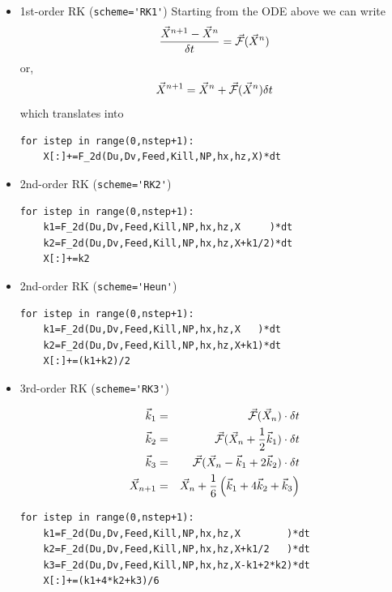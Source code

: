\begin{itemize}

\item 1st-order RK (\lstinline{scheme='RK1'})
Starting from the ODE above we can write
\[
\frac{\vec{X}^{n+1} -\vec{X}^{n} }{\delta t} = \vec{\cal F} (\vec{X}^n)
\]
or, 
\[
\vec{X}^{n+1}
=
\vec{X}^{n} + \vec{\cal F} (\vec{X}^n) \delta t
\]
which translates into
\begin{lstlisting}
for istep in range(0,nstep+1):
    X[:]+=F_2d(Du,Dv,Feed,Kill,NP,hx,hz,X)*dt
\end{lstlisting}

\item 2nd-order RK (\lstinline{scheme='RK2'})
\begin{lstlisting}
for istep in range(0,nstep+1):
    k1=F_2d(Du,Dv,Feed,Kill,NP,hx,hz,X     )*dt
    k2=F_2d(Du,Dv,Feed,Kill,NP,hx,hz,X+k1/2)*dt
    X[:]+=k2
\end{lstlisting}

\item 2nd-order RK (\lstinline{scheme='Heun'})

\begin{lstlisting}
for istep in range(0,nstep+1):
    k1=F_2d(Du,Dv,Feed,Kill,NP,hx,hz,X   )*dt
    k2=F_2d(Du,Dv,Feed,Kill,NP,hx,hz,X+k1)*dt
    X[:]+=(k1+k2)/2
\end{lstlisting}

\item 3rd-order RK (\lstinline{scheme='RK3'})

\begin{eqnarray}
\vec{k}_1 &=& \vec{\cal F}(\vec{X}_n) \cdot \delta t\nonumber\\
\vec{k}_2 &=& \vec{\cal F}(\vec{X}_n+ \frac{1}{2} \vec{k}_1) \cdot \delta t \nonumber\\
\vec{k}_3 &=& \vec{\cal F}(\vec{X}_n -\vec{k}_1 +2\vec{k}_2) \cdot \delta t \nonumber\\
\vec{X}_{n+1} &=& \vec{X}_n + \frac{1}{6}\left(\vec{k}_1 + 4\vec{k}_2 + \vec{k}_3 \right)
\end{eqnarray}

\begin{lstlisting}
for istep in range(0,nstep+1):
    k1=F_2d(Du,Dv,Feed,Kill,NP,hx,hz,X        )*dt
    k2=F_2d(Du,Dv,Feed,Kill,NP,hx,hz,X+k1/2   )*dt
    k3=F_2d(Du,Dv,Feed,Kill,NP,hx,hz,X-k1+2*k2)*dt
    X[:]+=(k1+4*k2+k3)/6
\end{lstlisting}



\end{itemize}
